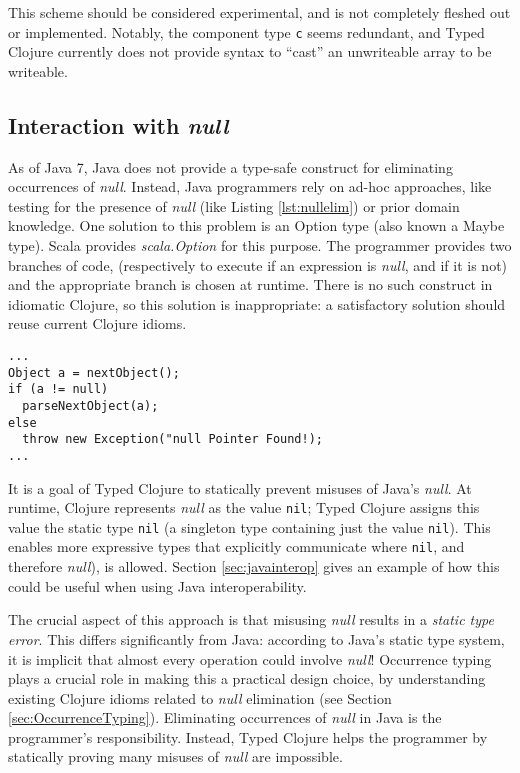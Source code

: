 This scheme should be considered experimental, and is not completely fleshed out or implemented.
Notably, the component type \lstinline|c| seems redundant, and Typed Clojure currently
does not provide syntax to ``cast'' an unwriteable array to be writeable.

\subsection{Interaction with \emph{null}}
\label{sec:interactionnull}

As of Java 7, Java does not provide a type-safe construct for eliminating
occurrences of \emph{null}. Instead, Java programmers rely on ad-hoc approaches,
like testing for the presence of \emph{null} (like Listing \ref{lst:nullelim}) or prior domain knowledge.
One solution to this problem is an Option type (also known a Maybe type).
Scala provides \emph{scala.Option} for this purpose. The programmer provides two branches of code,
(respectively to execute if an expression is \emph{null}, and if it is not)
and the appropriate branch is chosen at runtime.
There is no such construct in idiomatic Clojure, so this solution is inappropriate:
a satisfactory solution should reuse current Clojure idioms.

\begin{lstlisting}[caption=null elimination in Java, label=lst:nullelim]
...
Object a = nextObject();
if (a != null)
  parseNextObject(a);
else
  throw new Exception("null Pointer Found!);
...
\end{lstlisting}

It is a goal of Typed Clojure to statically prevent misuses of Java's \emph{null}.
At runtime, Clojure represents \emph{null} as the value \lstinline|nil|;
Typed Clojure assigns this value the static type \lstinline|nil|
(a singleton type containing just the value \lstinline|nil|).
This enables more expressive types that explicitly communicate where \lstinline|nil|,
and therefore \emph{null}), is allowed.
Section \ref{sec:javainterop} gives an example of how this could be useful 
when using Java interoperability.

The crucial aspect of this approach is that misusing \emph{null} results in a \emph{static type error}.
This differs significantly from Java: according to Java's static type system,
it is implicit that almost every operation could involve \emph{null}!
Occurrence typing~\cite{TF10} plays a crucial role in making this a practical
design choice, by understanding existing Clojure idioms related to \emph{null} elimination (see Section \ref{sec:OccurrenceTyping}).
Eliminating occurrences of \emph{null} in Java is the programmer's responsibility.
Instead, Typed Clojure helps the programmer by statically proving many misuses of \emph{null} are impossible.

